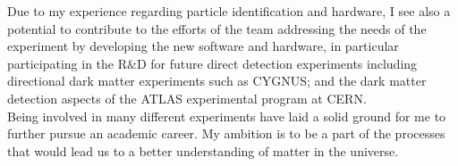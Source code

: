 \documentclass[a4paper,roman]{article}
\begin{document}


Due to my experience regarding particle identification and hardware, I see also a potential to contribute to the efforts of the team addressing the needs of the experiment by developing the new software and hardware, 
in particular participating in the R$\&$D for future direct detection experiments including directional dark matter experiments such as CYGNUS; and the dark matter detection aspects of the ATLAS experimental program at CERN.
\\
Being involved in many different experiments have laid a solid ground for me to further pursue an academic career. My ambition is to be a part of the processes that would lead us to a better understanding of matter in the universe.
\end{document}
